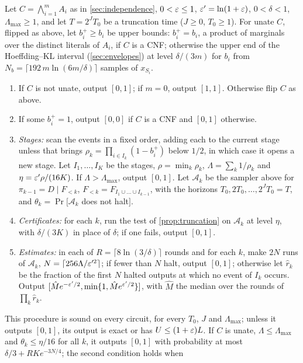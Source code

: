 \begin{theorem}\label{thm:cftp}
Let $C=\bigwedge_{i=1}^mA_i$ as in \cref{sec:independence}, $0<\varepsilon\le1$,
$\varepsilon'=\ln(1+\varepsilon)$, $0<\delta<1$, $\Lambda_{\max}\ge1$, and let $T=2^JT_0$ be a
truncation time ($J\ge0$, $T_0\ge1$). For unate $C$, flipped as above, let $b_i^+\ge b_i$
be upper bounds: $b_i^+=b_i$, a product of marginals over the distinct literals of
$A_i$, if $C$ is a CNF; otherwise the upper end of the Hoeffding--KL interval
(\cref{sec:envelopes}) at level $\delta/(3m)$ for $b_i$ from
$N_b=\lceil192\,m\ln(6m/\delta)\rceil$ samples of $x_{S_i}$.
\begin{enumerate}[label=(\arabic*),start=0]
\item If $C$ is not unate, output $[0,1]$; if $m=0$, output $[1,1]$. Otherwise flip $C$
as above.
\item If some $b_i^+=1$, output $[0,0]$ if $C$ is a CNF and $[0,1]$ otherwise.
\item \emph{Stages:} scan the events in a fixed order, adding each to the current
stage unless that brings $\rho_k=\prod_{i\in I_k}(1-b_i^+)$ below $1/2$, in which
case it opens a new stage. Let $I_1,\dots,I_K$ be the stages, $\rho=\min_k\rho_k$,
$\Lambda=\sum_k1/\rho_k$ and $\eta=\varepsilon'\rho/(16K)$. If $\Lambda>\Lambda_{\max}$,
output $[0,1]$. Let $\mathcal A_k$ be the sampler above for $\pi_{k-1}=D\mid F_{<k}$,
$F_{<k}=F_{I_1\cup\dots\cup I_{k-1}}$, with the horizons $T_0,2T_0,\dots,2^JT_0=T$, and
$\theta_k=\Pr[\mathcal A_k$ does not halt$]$.
\item \emph{Certificates:} for each $k$, run the test of \cref{prop:truncation} on
$\mathcal A_k$ at level $\eta$, with $\delta/(3K)$ in place of $\delta$; if one
fails, output $[0,1]$.
\item \emph{Estimates:} in each of $R=\lceil8\ln(3/\delta)\rceil$ rounds and for each
$k$, make $2N$ runs of $\mathcal A_k$, $N=\lceil256\Lambda/\varepsilon'^2\rceil$; if fewer
than $N$ halt, output $[0,1]$; otherwise let $\hat r_k$ be the fraction of the first
$N$ halted outputs at which no event of $I_k$ occurs.
Output $[\hat Me^{-\varepsilon'/2},\min\{1,\hat Me^{\varepsilon'/2}\}]$, with $\hat M$ the median
over the rounds of $\prod_k\hat r_k$.
\end{enumerate}
This procedure is sound on every circuit, for every $T_0$, $J$ and $\Lambda_{\max}$;
unless it outputs $[0,1]$, its output is exact or has $U\le(1+\varepsilon)L$. If $C$ is unate,
$\Lambda\le\Lambda_{\max}$ and $\theta_k\le\eta/16$ for all $k$, it outputs $[0,1]$ with
probability at most $\delta/3+RKe^{-3N/4}$; the second condition holds when

\end{theorem}
